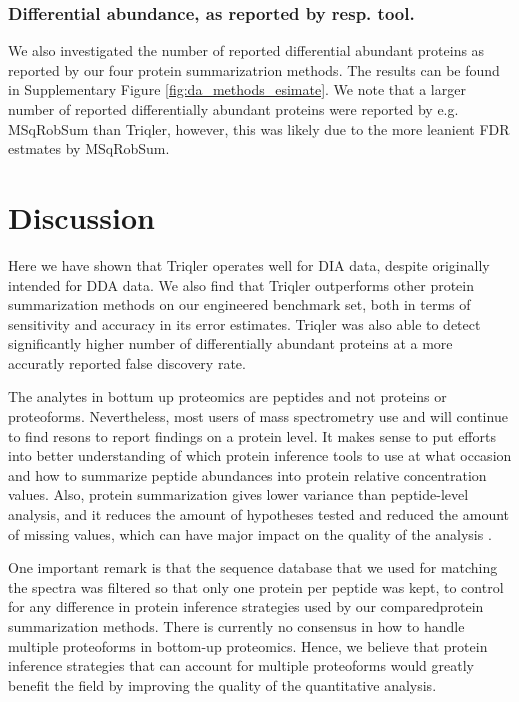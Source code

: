 \documentclass[10pt,letterpaper]{article}
\begin{document}
\subsubsection*{Differential abundance, as reported by resp. tool.}

We also investigated the number of reported differential abundant proteins as reported by our four protein summarizatrion methods. The results can be found in Supplementary Figure \ref{fig:da_methods_esimate}. We note that a larger number of reported differentially abundant proteins were reported by e.g. MSqRobSum than Triqler, however, this was likely due to the more leanient FDR estmates by MSqRobSum.



\section*{Discussion}


Here we have shown that Triqler operates well for DIA data, despite originally intended for DDA data. We also find that Triqler outperforms other protein summarization methods on our engineered benchmark set, both in terms of sensitivity and accuracy in its error estimates. Triqler was also able to detect significantly higher number of differentially abundant proteins at a more accuratly reported false discovery rate. 

The analytes in bottum up proteomics are peptides and not proteins or proteoforms. Nevertheless, most users of mass spectrometry use and will continue to find resons to report findings on a protein level. It makes sense to put efforts into better understanding of which protein inference tools to use at what occasion and how to summarize peptide abundances into protein relative concentration values.  Also, protein summarization gives lower variance than peptide-level analysis, and it reduces the amount of hypotheses tested and reduced the amount of missing values, which can have major impact on the quality of the analysis \cite{plubell2021can}.   


One important remark is that the sequence database that we used for matching the spectra was filtered so that only one protein per peptide was kept, to control for any difference in protein inference strategies used by our comparedprotein summarization methods. There is currently no consensus in how to handle multiple proteoforms in bottom-up proteomics. Hence, we believe that protein inference strategies that can account for multiple proteoforms would greatly benefit the field by improving the quality of the quantitative analysis. 
\end{document}
